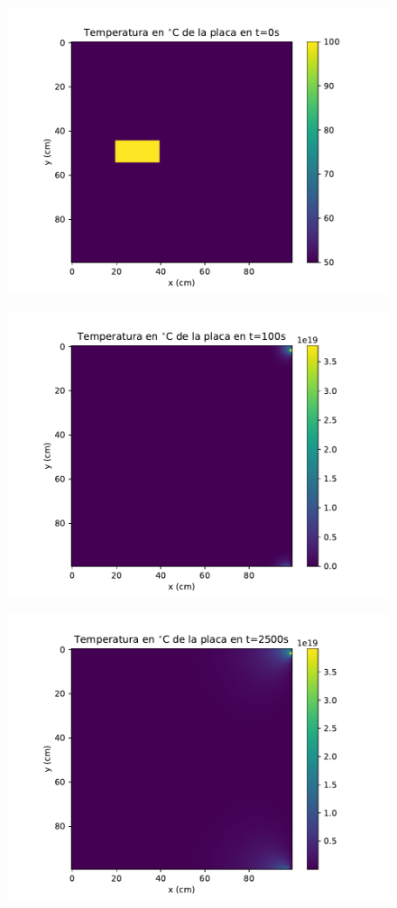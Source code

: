 \documentclass[12pt,letterpaper]{article}
\begin{document}
\begin{figure}[H]
\includegraphics{a1_0.pdf}
\centering
\end{figure}

\begin{figure}[H]
\includegraphics{a1_100.pdf}
\centering
\end{figure}

\begin{figure}[H]
\includegraphics{a1_2500.pdf}
\centering
\end{figure}
\end{document}

